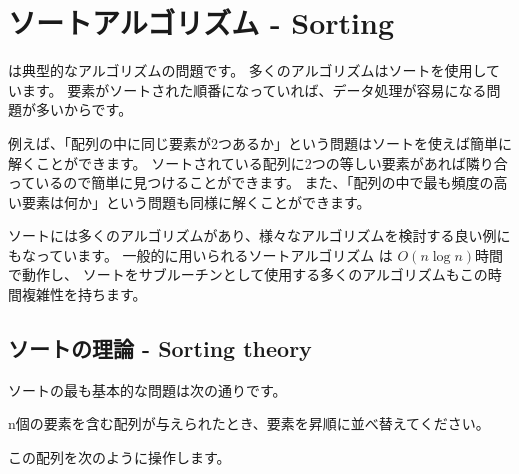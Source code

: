\chapter{ソートアルゴリズム - Sorting}


は典型的なアルゴリズムの問題です。
多くのアルゴリズムはソートを使用しています。
要素がソートされた順番になっていれば、データ処理が容易になる問題が多いからです。

例えば、「配列の中に同じ要素が2つあるか」という問題はソートを使えば簡単に解くことができます。
ソートされている配列に2つの等しい要素があれば隣り合っているので簡単に見つけることができます。
また、「配列の中で最も頻度の高い要素は何か」という問題も同様に解くことができます。

ソートには多くのアルゴリズムがあり、様々なアルゴリズムを検討する良い例にもなっています。
一般的に用いられるソートアルゴリズム は $O(n \log n)$時間で動作し、
ソートをサブルーチンとして使用する多くのアルゴリズムもこの時間複雑性を持ちます。

\section{ソートの理論 - Sorting theory}

ソートの最も基本的な問題は次の通りです。
\begin{framed}
\noindent
 n個の要素を含む配列が与えられたとき、要素を昇順に並べ替えてください。
\end{framed}
\noindent
\begin{center}
\end{center}
この配列を次のように操作します。
\begin{center}
\end{center}

